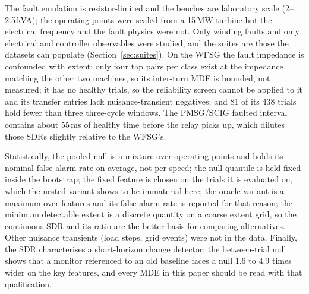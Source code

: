 The fault emulation is resistor-limited and the benches are laboratory scale (2--2.5\,kVA); the operating points were scaled from a 15\,MW turbine but the electrical frequency and the fault physics were not. Only winding faults and only electrical and controller observables were studied, and the suites are those the datasets can populate (Section~\ref{sec:suites}). On the WFSG the fault impedance is confounded with extent; only four tap pairs per class exist at the impedance matching the other two machines, so its inter-turn MDE is bounded, not measured; it has no healthy trials, so the reliability screen cannot be applied to it and its transfer entries lack nuisance-transient negatives; and 81 of its 438 trials hold fewer than three three-cycle windows. The PMSG/SCIG faulted interval contains about 55\,ms of healthy time before the relay picks up, which dilutes those SDRs slightly relative to the WFSG's.

Statistically, the pooled null is a mixture over operating points and holds its nominal false-alarm rate on average, not per speed; the null quantile is held fixed inside the bootstrap; the fixed feature is chosen on the trials it is evaluated on, which the nested variant shows to be immaterial here; the oracle variant is a maximum over features and its false-alarm rate is reported for that reason; the minimum detectable extent is a discrete quantity on a coarse extent grid, so the continuous SDR and its ratio are the better basis for comparing alternatives. Other nuisance transients (load steps, grid events) were not in the data. Finally, the SDR characterises a short-horizon change detector; the between-trial null shows that a monitor referenced to an old baseline faces a null 1.6 to 4.9 times wider on the key features, and every MDE in this paper should be read with that qualification.

